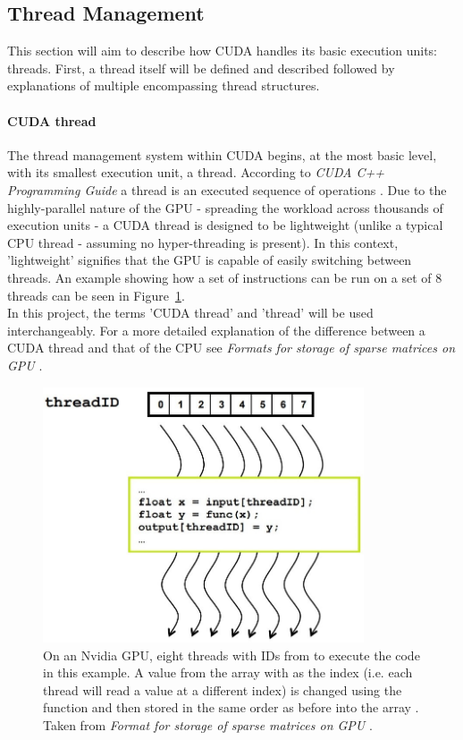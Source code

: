 \subsection{Thread Management}\label{Subsection:thread-management}
This section will aim to describe how CUDA handles its basic execution units: threads. First, a thread itself will be defined and described followed by explanations of multiple encompassing thread structures.

\paragraph{CUDA thread}
The thread management system within CUDA begins, at the most basic level, with its smallest execution unit, a thread. According to \emph{CUDA C++ Programming Guide} a thread is an executed sequence of operations \cite{NVIDIAMay2022}. Due to the highly-parallel nature of the GPU - spreading the workload across thousands of execution units - a CUDA thread is designed to be lightweight (unlike a typical CPU thread - assuming no hyper-threading is present). In this context, 'lightweight' signifies that the GPU is capable of easily switching between threads. An example showing how a set of instructions can be run on a set of 8 threads can be seen in Figure~\ref{Figure:CUDA-thread-parallelism}. \\
In this project, the terms 'CUDA thread' and 'thread' will be used interchangeably. For a more detailed explanation of the difference between a CUDA thread and that of the CPU see \emph{Formats for storage of sparse matrices on GPU} \cite{Cejka2020}.

\begin{figure}[h!]
	\centering
	\includegraphics[width=9.5cm, keepaspectratio, clip]{images/ch1/CUDA_thread_parallelism.jpg}
	\caption{On an Nvidia GPU, eight threads with IDs from  to  execute the code in this example. A value from the array  with  as the index (i.e. each thread will read a value at a different index) is changed using the function  and then stored in the same order as before into the array . Taken from \emph{Format for storage of sparse matrices on GPU} \cite{Cejka2020, Ruetsch2008}.}
	\label{Figure:CUDA-thread-parallelism}
\end{figure}

